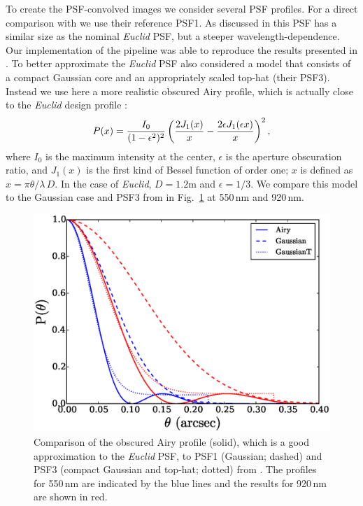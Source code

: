 \documentclass[useAMS,usenatbib]{mnras}
\newcommand{\be}{\begin{equation}}
\newcommand{\ee}{\end{equation}}
\newcommand{\rund}[1]{\left(#1\right)}
\def\elabel#1{\label{eq:#1}}
\begin{document}
To create the PSF-convolved images we consider several PSF profiles. For a direct comparison with  we use their reference PSF1. As discussed in  this PSF has a similar size as the nominal {\it Euclid} PSF, but a steeper wavelength-dependence. Our implementation of the pipeline was able to reproduce the results presented in .
To better approximate the {\it Euclid} PSF  also considered a model that  consists of a compact Gaussian core and an appropriately scaled top-hat (their PSF3). Instead we use here a more realistic obscured Airy profile, which is actually close to the {\it Euclid} design profile \citep{Laureijs11}:
%
\be
P(x) = {I_0 \over (1-\epsilon^2)^2} \rund{{2J_1(x)\over x} -
{2\epsilon J_1(\epsilon x) \over x}}^2,
\elabel{psfairy}
\ee
%
where $I_0$ is the maximum intensity at the center, $\epsilon$ is the aperture obscuration ratio, and $J_1(x)$ is the first kind of Bessel function of order one; $x$ is defined as $x=\pi \theta/\lambda\, D $.
In the case of {\it Euclid}, $D=1.2$m and $\epsilon=1/3$. We compare this model to the Gaussian
case and PSF3 from  in Fig.~\ref{fig:psfmodel} at 550\,nm and 920\,nm.

\begin{figure}
\centerline{\includegraphics[width=\hsize]{zairy.eps}}
\caption{Comparison of the obscured Airy profile (solid), which is a good approximation
to the {\it Euclid} PSF, to PSF1 (Gaussian; dashed) and PSF3 (compact Gaussian and
top-hat; dotted) from . The profiles for 550\,nm are indicated by the blue lines and
the results for 920\,nm are shown in red.}
\label{fig:psfmodel}
\end{figure}
%
\end{document}
